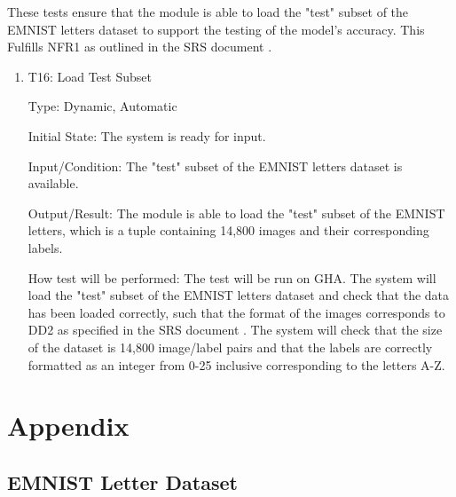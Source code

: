 \documentclass[12pt, titlepage]{article}
\begin{document}
These tests ensure that the module is able to load the "test" subset of the
EMNIST letters dataset to support the testing of the model's accuracy. This
Fulfills NFR1 as outlined in the SRS document \citep{SRS}.

\begin{enumerate}

\item{T16: Load Test Subset\\}

Type: Dynamic, Automatic

Initial State: The \progname{} system is ready for input.

Input/Condition: The "test" subset of the EMNIST letters dataset is available.

Output/Result: The module is able to load the "test" subset of the EMNIST
letters, which is a tuple containing 14,800 images and their corresponding
labels.

How test will be performed: The test will be run on GHA. The system will load
the "test" subset of the EMNIST letters dataset and check that the data has been
loaded correctly, such that the format of the images corresponds to DD2 as
specified in the SRS document \citep{SRS}. The system will check that the size
of the dataset is 14,800 image/label pairs and that the labels are correctly
formatted as an integer from 0-25 inclusive corresponding to the letters A-Z.

\end{enumerate}



				




\newpage

\section{Appendix}

\subsection{EMNIST Letter Dataset}
\label{sec:EMNISTLetters}
\end{document}
